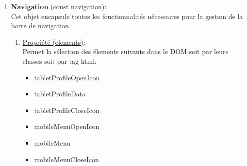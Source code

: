 \documentclass[a4paper,11pt]{article}
\begin{document}
            \begin{enumerate}
                \item \textbf{Navigation} (const navigation): \\
                   
                    \noindent Cet objet encapsule toutes les fonctionnalités nécessaires pour la gestion de la barre de navigation.

                    \begin{enumerate}
                        \item \underline{Propriété (elements)}: \\
                            Permet la sélection des élements suivants dans le DOM soit par leurs classes soit par tag html:
                            \begin{itemize}
                                \item tabletProfileOpenIcon
                                \item tabletProfileData
                                \item tabletProfileCloseIcon
                                \item mobileMenuOpenIcon
                                \item mobileMenu
                                \item mobileMenuCloseIcon
                            \end{itemize}


\end{enumerate}
\end{enumerate}
\end{document}
